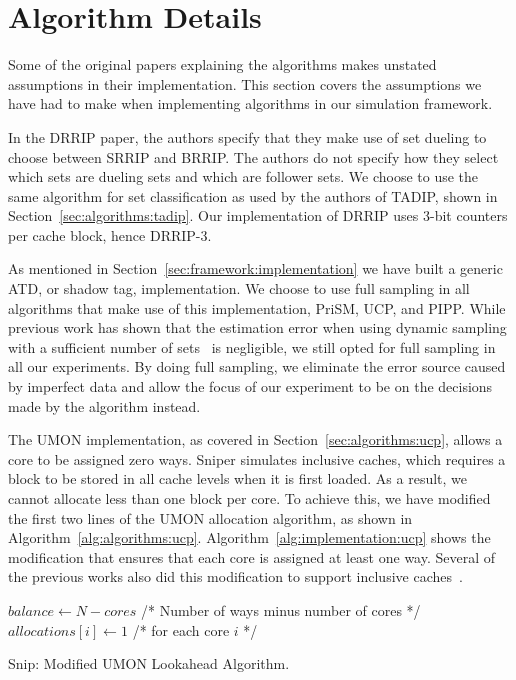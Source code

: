 \section{Algorithm Details}
\label{sec:framework:algorithms}

Some of the original papers explaining the algorithms makes unstated assumptions in their implementation.
This section covers the assumptions we have had to make when implementing algorithms in our simulation framework.

In the DRRIP paper, the authors specify that they make use of set dueling to choose between SRRIP and BRRIP.
The authors do not specify how they select which sets are dueling sets and which are follower sets.
We choose to use the same algorithm for set classification as used by the authors of TADIP, shown in Section~\ref{sec:algorithms:tadip}.
Our implementation of DRRIP uses 3-bit counters per cache block, hence DRRIP-3.

As mentioned in Section~\ref{sec:framework:implementation} we have built a generic ATD, or shadow tag, implementation.
We choose to use full sampling in all algorithms that make use of this implementation, PriSM, UCP, and PIPP.
While previous work has shown that the estimation error when using dynamic sampling with a sufficient number of sets~\cite{Jaleel2008} is negligible, we still opted for full sampling in all our experiments.
By doing full sampling, we eliminate the error source caused by imperfect data and allow the focus of our experiment to be on the decisions made by the algorithm instead.

The UMON implementation, as covered in Section~\ref{sec:algorithms:ucp}, allows a core to be assigned zero ways.
Sniper simulates inclusive caches, which requires a block to be stored in all cache levels when it is first loaded.
As a result, we cannot allocate less than one block per core.
To achieve this, we have modified the first two lines of the UMON allocation algorithm, as shown in Algorithm~\ref{alg:algorithms:ucp}.
Algorithm~\ref{alg:implementation:ucp} shows the modification that ensures that each core is assigned at least one way.
Several of the previous works also did this modification to support inclusive caches~\cite{Qureshi2006,Xie2009}.

\begin{algorithm}[ht]
\begin{algorithmic}[1]
\State $balance\gets N - cores $ /* Number of ways minus number of cores */
\State $allocations[i]\gets 1$ /* for each core $i$ */
\end{algorithmic}
\caption{Snip: Modified UMON Lookahead Algorithm.}
\label{alg:implementation:ucp}
\end{algorithm}

